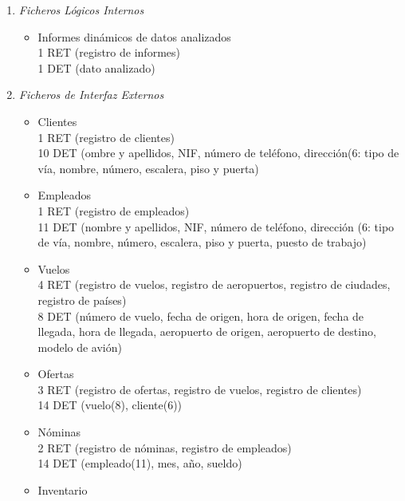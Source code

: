 
\begin{enumerate}
	\item \textit{Ficheros Lógicos Internos}
		\begin{itemize}
			\item Informes dinámicos de datos analizados \\
			1 RET (registro de informes) \\
			1 DET (dato analizado) \\
		\end{itemize}
	\item \textit{Ficheros de Interfaz Externos}
		\begin{itemize}
			\item Clientes  \\
			1 RET (registro de clientes) \\
			10 DET (ombre y apellidos, NIF, número de teléfono, dirección(6: tipo de vía, nombre, número, escalera, piso y puerta) \\
			\item Empleados \\
			1 RET (registro de empleados) \\
			11 DET (nombre y apellidos, NIF, número de teléfono, dirección (6: tipo de vía, nombre, número, escalera, piso y puerta,
			puesto de trabajo) \\
			\item Vuelos \\
			4 RET (registro de vuelos, registro de aeropuertos, registro de ciudades, registro de países) \\
			8 DET (número de vuelo, fecha de origen, hora de origen, fecha de llegada, hora de llegada, aeropuerto de origen,
			aeropuerto de destino, modelo de avión) \\
			\item Ofertas \\
			3 RET (registro de ofertas, registro de vuelos, registro de clientes) \\
			14 DET (vuelo(8), cliente(6)) \\
			\item Nóminas \\
			2 RET (registro de nóminas, registro de empleados) \\
			14 DET (empleado(11), mes, año, sueldo) \\
			\item Inventario \\

\end{itemize}
\end{enumerate}

